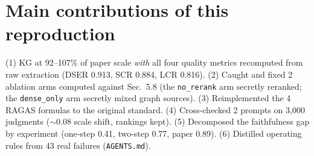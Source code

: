 \documentclass[12pt,a4paper]{article}
\begin{document}
\section{Main contributions of this reproduction}
(1) KG at 92--107\% of paper scale \textit{with} all four quality metrics
recomputed from raw extraction (DSER 0.913, SCR 0.884, LCR 0.816).
(2) Caught and fixed 2 ablation arms computed against Sec.~5.8 (the
\texttt{no\_rerank} arm secretly reranked; the \texttt{dense\_only} arm
secretly mixed graph sources).
(3) Reimplemented the 4 RAGAS formulas to the original standard.
(4) Cross-checked 2 prompts on 3,000 judgments ($\sim$0.08 scale shift,
rankings kept).
(5) Decomposed the faithfulness gap by experiment (one-step 0.41, two-step
0.77, paper 0.89).
(6) Distilled operating rules from 43 real failures (\texttt{AGENTS.md}).

\end{document}
